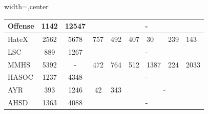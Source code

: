 \begin{table}[ht]
\begin{adjustbox}{width=\textwidth,center}
\begin{tabular}{|l|cc|ccclll|}
Offense                                                       & \multicolumn{1}{c|}{1142}            & 12547             & \multicolumn{6}{c|}{-}                                                                                                                                                                                                                                    \\ \hline
HateX                                                       & \multicolumn{1}{c|}{2562}            & 5678              & \multicolumn{1}{c|}{757}             & \multicolumn{1}{c|}{492}             & \multicolumn{1}{c|}{407}                          & \multicolumn{1}{l|}{30}                  & \multicolumn{1}{l|}{239}               & 143                                 \\ \hline
LSC                                                       & \multicolumn{1}{c|}{889}             & 1267              & \multicolumn{6}{c|}{-}                                                                                                                                                                                                                                    \\ \hline
MMHS                                                       & \multicolumn{1}{c|}{5392}            & -                 & \multicolumn{1}{c|}{472}             & \multicolumn{1}{c|}{764}             & \multicolumn{1}{c|}{512}                          & \multicolumn{1}{l|}{1387}                & \multicolumn{1}{l|}{224}               & 2033                                \\ \hline
HASOC                                                       & \multicolumn{1}{c|}{1237}            & 4348              & \multicolumn{6}{c|}{-}                                                                                                                                                                                                                                    \\ \hline
AYR                                                       & \multicolumn{1}{c|}{393}             & 1246              & \multicolumn{1}{c|}{42}              & \multicolumn{1}{c|}{343}             & \multicolumn{4}{c|}{-}                                                                                                                                                      \\ \hline
AHSD                                                       & \multicolumn{1}{c|}{1363}            & 4088              & \multicolumn{6}{c|}{-}                                                                                                                                                                                                                                    \\ \hline

\end{tabular}
\end{adjustbox}
\end{table}
